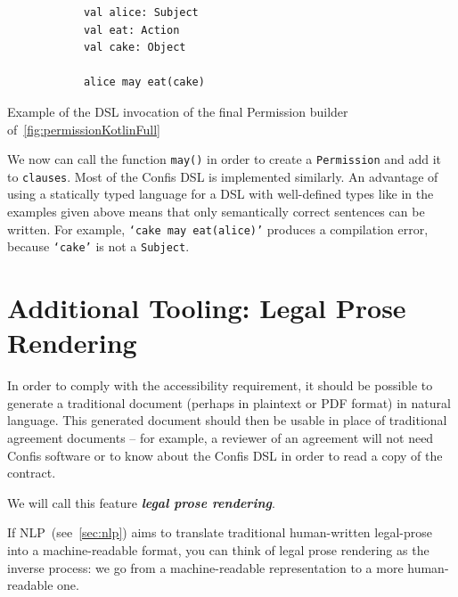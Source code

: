 \begin{listing}[h]
    \centering
    \begin{minipage}{0.5\textwidth}
        \begin{verbatim}
            val alice: Subject
            val eat: Action
            val cake: Object

            alice may eat(cake)
        \end{verbatim}
    \end{minipage}
    \caption{Example of the DSL invocation of the final Permission builder of~\autoref{fig:permissionKotlinFull}}
    \label{fig:finalPermissionInvocationDSL}
\end{listing}

We now can call the function \texttt{may()} in order to create a \texttt{Permission} and add it to \texttt{clauses}.
Most of the Confis DSL is implemented similarly.
An advantage of using a statically typed language for a DSL with well-defined types like in the examples given above means that only semantically correct sentences can be written.
For example, \texttt{`cake may eat(alice)'} produces a compilation error, because \texttt{`cake'} is not a \texttt{Subject}.




\section{Additional Tooling: Legal Prose Rendering}\label{sec:additional-tooling:doc-rendering}

In order to comply with the accessibility requirement, it should be possible to generate a traditional document (perhaps in plaintext or PDF format) in natural language.
This generated document should then be usable in place of traditional agreement documents -- for example, a reviewer of an agreement will not need Confis software or to know about the Confis DSL in order to read a copy of the contract.

We will call this feature \textbf{\emph{legal prose rendering}}.

If NLP~(see~\autoref{sec:nlp}) aims to translate traditional human-written legal-prose into a machine-readable format, you can think of legal prose rendering as the inverse process: we go from a machine-readable representation to a more human-readable one.


